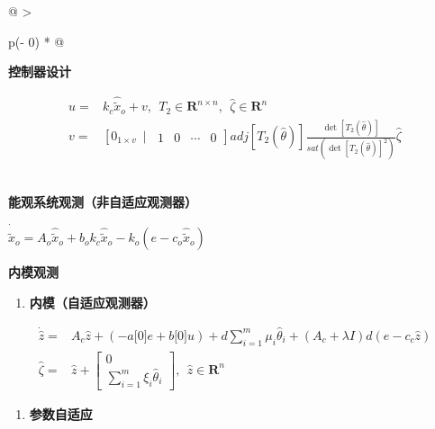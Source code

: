 \documentclass[
  12pt,
  a4paper
]{article}
\begin{document}
\begin{longtable}[]{@{}
  >{\raggedright\arraybackslash}p{}@{}}
\toprule\noalign{}
\begin{minipage}[b]{\linewidth}\raggedright
\textbf{控制器设计}

\[\begin{aligned}
u = & k_{c}{\widehat{\widetilde{x}}}_{o} + v,\ \ T_{2} \in \mathbf{R}^{n \times n},\ \ \widehat{\zeta} \in \mathbf{R}^{n} \\
v = & \left\lbrack 0_{1 \times v}\ \mid\ \begin{matrix}
1 & 0 & \cdots & 0
\end{matrix} \right\rbrack adj\left\lbrack T_{2}\left( \widehat{\theta} \right) \right\rbrack\frac{\det\left\lbrack T_{2}\left( \widehat{\theta} \right) \right\rbrack}{sat\left( {\det\left\lbrack T_{2}\left( \widehat{\theta} \right) \right\rbrack}^{2} \right)}\widehat{\zeta}
\end{aligned}\]
\end{minipage} \\
\midrule\noalign{}
\endhead
\bottomrule\noalign{}
\endlastfoot
\textbf{能观系统观测（非自适应观测器）}

\({\dot{\widehat{\widetilde{x}}}}_{o} = A_{o}{\widehat{\widetilde{x}}}_{o} + b_{o}k_{c}{\widehat{\widetilde{x}}}_{o} - k_{o}(e - c_{o}{\widehat{\widetilde{x}}}_{o})\) \\
\begin{minipage}[t]{\linewidth}\raggedright
\textbf{内模观测}

\begin{enumerate}
\def\labelenumi{\arabic{enumi}.}
\item
  \textbf{内模（自适应观测器）}
\end{enumerate}

\[\begin{aligned}
\dot{\widehat{z}} = & A_{c}\widehat{z} + ( - a\lbrack 0\rbrack e + b\lbrack 0\rbrack u) + d\sum_{i = 1}^{m}{\mu_{i}{\widehat{\theta}}_{i}} + (A_{c} + \lambda I)d\left( e - c_{c}\widehat{z} \right) \\
\widehat{\zeta} = & \widehat{z} + \begin{bmatrix}
0 \\
\sum_{i = 1}^{m}{\xi_{i}{\widehat{\theta}}_{i}}
\end{bmatrix},\ \ \widehat{z} \in \mathbf{R}^{n}
\end{aligned}\]

\begin{enumerate}
\def\labelenumi{\arabic{enumi}.}
\setcounter{enumi}{1}
\item
  \textbf{参数自适应}
\end{enumerate}


\end{minipage}
\end{longtable}
\end{document}
